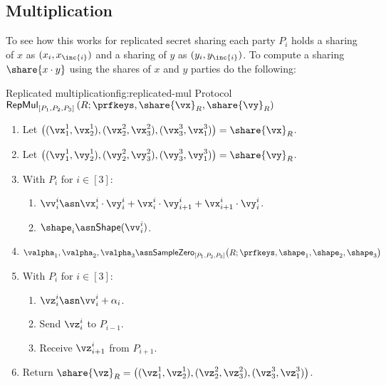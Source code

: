 \subsection{Multiplication}

To see how this works for replicated secret sharing each party $P_i$ holds a
sharing of $x$ as $(x_i, x_{ \inc{i} })$ and a sharing of $y$ as $(y_i, y_{
\inc{i} })$. To compute a sharing $\share{x \cdot y}$ using the shares of $x$
and $y$ parties do the following:



\begin{Boxfig}{Replicated multiplication}{fig:replicated-mul}
  {Protocol $\mathsf{RepMul}_{[P_1, P_2, P_3]}\left( R; \prfkeys, \share{\vx}_R, \share{\vy}_R \right)$}
  \begin{enumerate}
  \item Let $\left( (\vx_1^1, \vx_2^1), (\vx_2^2, \vx_3^2), (\vx_3^3, \vx_1^3) \right) = \share{\vx}_R$.
  \item Let $\left( (\vy_1^1, \vy_2^1), (\vy_2^2, \vy_3^2), (\vy_3^3, \vy_1^3) \right) = \share{\vy}_R$.
  
  \item With $P_i$ for $i \in [3]$:
  \begin{enumerate}
    \item $\vv_i^i \asn \vx_i^i \cdot \vy_i^i + \vx_i^i \cdot \vy_{i+1}^i + \vx_{i+1}^i \cdot \vy_i^i$.
    \item $\shape_i \asn \mathsf{Shape}(\vv_i^i)$.
  \end{enumerate}

  \item $\valpha_1, \valpha_2, \valpha_3 \asn \mathsf{SampleZero}_{[P_1, P_2, P_3]}\big( R; \prfkeys, \shape_1, \shape_2, \shape_3 \big)$

  \item With $P_i$ for $i \in [3]$:
  \begin{enumerate}
    \item $\vz_i^i \asn \vv_i^i + \alpha_i$.
    \item Send $\vz_i^i$ to $P_{i-1}$.
    \item Receive $\vz_{i+1}^i$ from $P_{i+1}$.
  \end{enumerate}

  \item Return $\share{\vz}_R = \left( (\vz_1^1, \vz_2^1), (\vz_2^2, \vz_3^2), (\vz_3^3, \vz_1^3) \right)$.
  \end{enumerate}
\end{Boxfig}


